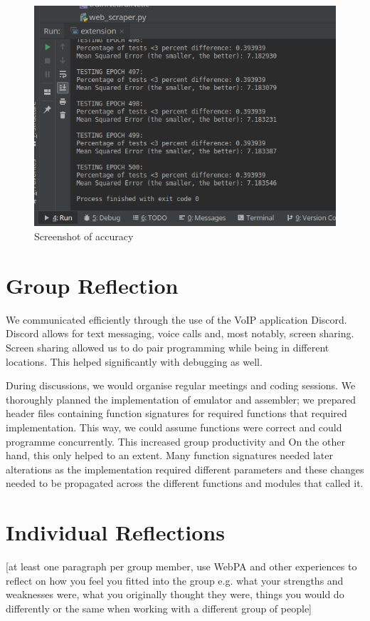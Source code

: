 \documentclass[11pt]{article}
\begin{document}
\begin{figure}
\centering
\includegraphics[scale=0.5]{accuracy}
\caption{Screenshot of accuracy}
\end{figure}

\section{Group Reflection}
We communicated efficiently through the use of the VoIP application Discord. 
Discord allows for text messaging, voice calls and, most notably, screen sharing.
Screen sharing allowed us to do pair programming while being in different locations. This helped significantly with debugging as well. 

During discussions, we would organise regular meetings and coding sessions. We thoroughly planned the implementation of emulator and assembler; we prepared header files containing function signatures
for required functions that 
 required implementation. This way, we could assume functions were correct and could programme concurrently.
This increased group productivity and 
On the other hand, this only helped to an extent. Many function signatures needed later alterations 
as the implementation required different parameters and these changes needed to be propagated 
across the different functions and modules that called it.

\section{Individual Reflections}
[at least one paragraph per group member, use WebPA and other experiences to reflect on how you feel you fitted into the group e.g. what your strengths and weaknesses were, what you originally thought they were, things you would do differently or the same when working with a different group of people]
\end{document}
